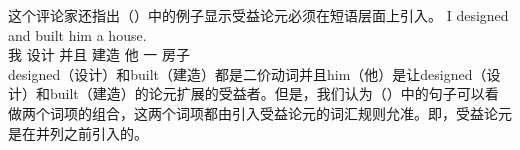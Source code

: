     这个评论家还指出（）中的例子显示受益论元必须在短语层面上引入。
\ea
\gll I designed and built him a house.\\
     我  设计 并且 建造 他 一 房子\\
\z
designed（设计）和built（建造）都是二价动词并且him（他）是让designed（设计）和built（建造）的论元扩展的受益者。但是，我们认为（）中的句子可以看做两个词项的组合，这两个词项都由引入受益论元的词汇规则允准。即，受益论元是在并列之前引入的。

